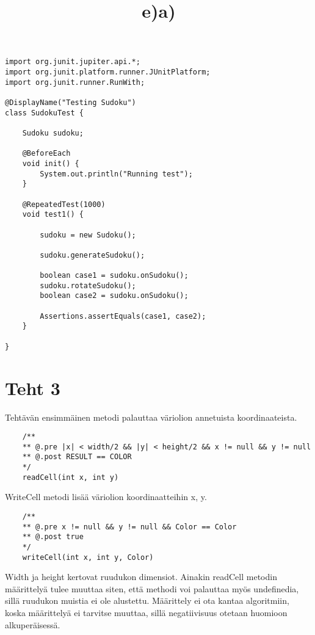 \documentclass[a4paper,12pt,titlepage]{article}
\theoremstyle{definition}
\theoremstyle{remark}
\begin{document}
\title{e)}
\begin{lstlisting}
import org.junit.jupiter.api.*;
import org.junit.platform.runner.JUnitPlatform;
import org.junit.runner.RunWith;

@DisplayName("Testing Sudoku")
class SudokuTest {

    Sudoku sudoku;

    @BeforeEach
    void init() {
        System.out.println("Running test");
    }

    @RepeatedTest(1000)
    void test1() {

        sudoku = new Sudoku();

        sudoku.generateSudoku();

        boolean case1 = sudoku.onSudoku();
        sudoku.rotateSudoku();
        boolean case2 = sudoku.onSudoku();

        Assertions.assertEquals(case1, case2);
    }

}

\end{lstlisting}
\newpage
\section{Teht 3}
\title{a)}
\newline
Tehtävän ensimmäinen metodi palauttaa väriolion annetuista koordinaateista.

\begin{lstlisting}
    /**
    ** @.pre |x| < width/2 && |y| < height/2 && x != null && y != null
    ** @.post RESULT == COLOR
    */
    readCell(int x, int y)
\end{lstlisting}
WriteCell metodi lisää väriolion koordinaatteihin x, y.
\begin{lstlisting}
    /**
    ** @.pre x != null && y != null && Color == Color
    ** @.post true
    */
    writeCell(int x, int y, Color)
\end{lstlisting}
Width ja height kertovat ruudukon dimensiot. Ainakin readCell metodin määrittelyä tulee muuttaa siten, että methodi voi palauttaa myös undefinedia, sillä ruudukon muistia ei ole alustettu. Määrittely ei ota kantaa algoritmiin, koska määrittelyä ei tarvitse muuttaa, sillä negatiivisuus otetaan huomioon alkuperäisessä.
\end{document}
